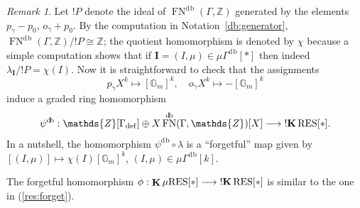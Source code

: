 \documentclass[12pt]{amsart}
\theoremstyle{plain}
\theoremstyle{definition}
\theoremstyle{remark}
\newtheorem{rem}[thm]{Remark}
\numberwithin{equation}{section}
\theoremstyle{plain}
\newcommand{\Z}{\mathds{Z}}
\newcommand{\G}{\mathds{G}}
\newcommand{\0}{\emptyset}
\newcommand{\fun}{\longrightarrow}
\newcommand{\efun}{\longmapsto}
\newcommand{\mG}{{\mu}{\Gamma}}
\newcommand{\RES}{\textup{RES}}
\newcommand{\mgRES}{{\mu}{\RES}}
\DeclareMathOperator{\ggk}{\mathbf{K}}
\DeclareMathOperator{\sggk}{!\mathbf{K}}
\DeclareMathOperator{\fn}{FN}
\DeclareMathOperator{\db}{d \! b}
\begin{document}
\begin{rem}\label{db:gam:res}
Let $!P$ denote the ideal of $\fn^{\db}(\Gamma, \Z)$ generated by the elements $p_\gamma - p_0$, $o_\gamma + p_0$. By the computation in Notation~\ref{db:generator}, $\fn^{\db}(\Gamma, \Z) / !P \cong \Z$; the quotient homomorphism is denoted by $\chi$ because a simple computation shows that if $\bm I = (I, \mu) \in \mG^{\db}[*]$ then indeed $\lambda_{\bm I} / !P = \chi(I)$. Now it is straightforward to check that the assignments
\begin{equation}\label{Gam:ass:bd}
p_\gamma X^k \efun  [\G_m]^{k}, \quad o_\gamma X^k \efun  - [\G_m]^{k}
\end{equation}
induce a graded ring homomorphism
\[
\psi^{\db} : \Z[\Gamma_{\mathrm{def}}] \oplus X\fn^{\db}(\Gamma, \Z)[X] \fun \sggk \RES[*].
\]
In a nutshell, the  homomorphism $\psi^{\db} \circ \lambda$ is a ``forgetful'' map  given by $[(I, \mu)] \efun \chi(I)[\G_m]^{k}$, $(I, \mu) \in \mG^{\db}[k]$.
\end{rem}


The forgetful homomorphism $\phi : \ggk \mgRES[*] \fun \sggk \RES[*]$ is similar to the one in  (\ref{res:forget}).
\end{document}
